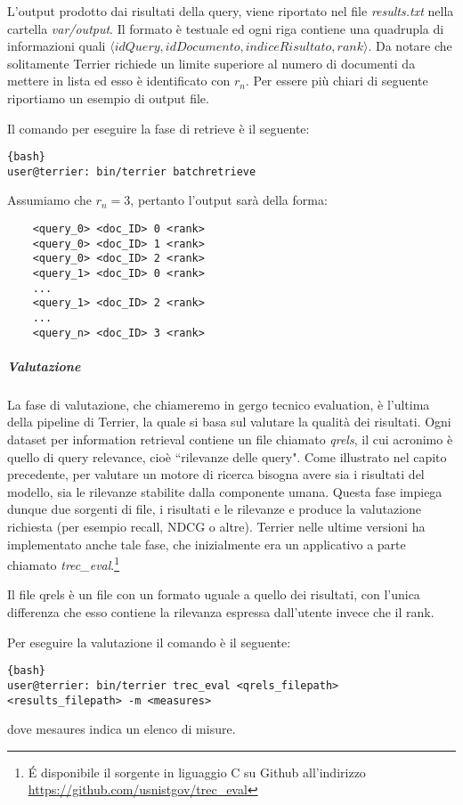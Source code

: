 L'output prodotto dai risultati della query, viene riportato
nel file \textit{results.txt} nella cartella \textit{var/output}. Il formato è testuale
ed ogni riga contiene una quadrupla di informazioni quali
$\langle idQuery, idDocumento, indiceRisultato, rank \rangle$.
Da notare che solitamente Terrier richiede un limite superiore
al numero di documenti da mettere in lista ed esso è identificato
con $r_n$. Per essere più chiari di seguente riportiamo un esempio
di output file.

Il comando per eseguire la fase di retrieve è il seguente:
\begin{lstlisting}{bash}
user@terrier: bin/terrier batchretrieve
\end{lstlisting}

\begin{esempio}
	Assumiamo che $r_n=3$, pertanto l'output sarà della forma:
	
	\begin{lstlisting}
	<query_0> <doc_ID> 0 <rank>
	<query_0> <doc_ID> 1 <rank>
	<query_0> <doc_ID> 2 <rank>
	<query_1> <doc_ID> 0 <rank>
	...
	<query_1> <doc_ID> 2 <rank>
	...
	<query_n> <doc_ID> 3 <rank>
	\end{lstlisting}
\end{esempio}

\subparagraph{Valutazione} La fase di valutazione, che chiameremo in gergo tecnico evaluation,
è l'ultima della pipeline di Terrier, la quale si basa sul valutare la qualità dei risultati.
Ogni dataset per information retrieval contiene un file chiamato \textit{qrels}, il cui
acronimo è quello di query relevance, cioè ``rilevanze delle query".
Come illustrato nel capito precedente, per valutare un motore di ricerca bisogna
avere sia i risultati del modello, sia le rilevanze stabilite dalla componente umana.
Questa fase impiega dunque due sorgenti di file, i risultati e le rilevanze e produce
la valutazione richiesta (per esempio recall, NDCG o altre).
Terrier nelle ultime versioni ha implementato anche tale fase,
che inizialmente era un applicativo a parte chiamato \textit{trec\_eval}.\footnote{\'E disponibile il sorgente in liguaggio C su Github all'indirizzo \href{https://github.com/usnistgov/trec_eval}{https://github.com/usnistgov/trec\_eval}}

Il file qrels è un file con un formato uguale a quello dei risultati,
con l'unica differenza che esso contiene la rilevanza espressa dall'utente invece che il rank.

Per eseguire la valutazione il comando è il seguente:
\begin{lstlisting}{bash}
user@terrier: bin/terrier trec_eval <qrels_filepath> <results_filepath> -m <measures>
\end{lstlisting}

dove mesaures indica un elenco di misure.
